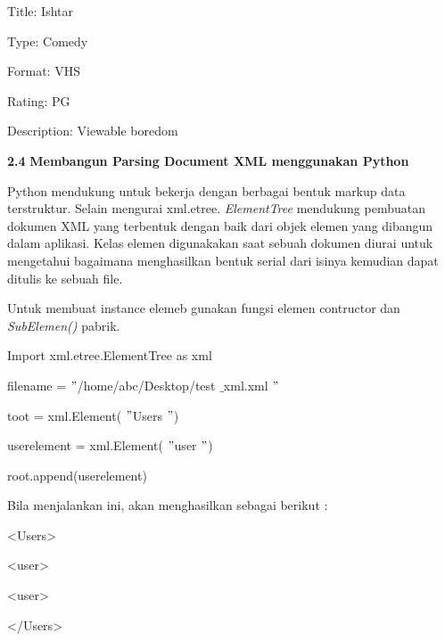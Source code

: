 Title: Ishtar \par
\noindent 
Type: Comedy \par
\noindent 
Format: VHS \par
\noindent 
Rating: PG \par
\noindent 
Description: Viewable boredom \par
\vspace{12pt}
\noindent 
\textbf{2.4}\textbf{ Membangun Parsing Document XML menggunakan Python} \par
\noindent 
 \hspace*{0.5in} Python mendukung untuk bekerja dengan berbagai bentuk markup data terstruktur. Selain mengurai xml.etree. \textit{ElementTree} mendukung pembuatan dokumen XML yang terbentuk dengan baik dari objek elemen yang dibangun dalam aplikasi. Kelas elemen digunakakan saat sebuah dokumen diurai untuk mengetahui bagaimana menghasilkan bentuk serial dari isinya kemudian dapat ditulis ke sebuah file.  \par
\vspace{12pt}
\noindent 
 \hspace*{0.5in} Untuk membuat instance elemeb gunakan fungsi elemen contructor dan \textit{SubElemen()} pabrik. \par
\noindent 
Import xml.etree.ElementTree as xml \par
\vspace{12pt}
\noindent 
{\fontsize{10pt}{10pt}\selectfont filename =  $ " $/home/abc/Desktop/test $  \_  $xml.xml $ " $} \par
\noindent 
{\fontsize{10pt}{10pt}\selectfont toot = xml.Element( $ " $Users $ " $)} \par
\noindent 
{\fontsize{10pt}{10pt}\selectfont userelement = xml.Element( $ " $user $ " $)} \par
\noindent 
{\fontsize{10pt}{10pt}\selectfont root.append(userelement)} \par
\noindent 
\vspace{10pt}
\noindent 
Bila menjalankan ini, akan menghasilkan sebagai berikut : \par
\noindent 
{\fontsize{10pt}{10pt}\selectfont <Users>} \par
\noindent 
{\fontsize{10pt}{10pt}\selectfont  \hspace*{0.5in} <user>} \par
\noindent 
{\fontsize{10pt}{10pt}\selectfont  \hspace*{0.5in} <user>} \par
\noindent 
{\fontsize{10pt}{10pt}\selectfont </Users>} \par

